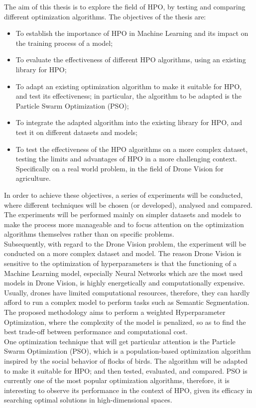 The aim of this thesis is to explore the field of HPO, by testing and comparing different optimization algorithms.
The objectives of the thesis are:
\begin{itemize}[itemsep=0.1cm]
	\item To establish the importance of HPO in Machine Learning and its impact on the training process of a model;
	\item To evaluate the effectiveness of different HPO algorithms, using an existing library for HPO;
	\item To adapt an existing optimization algorithm to make it suitable for HPO, and test its effectiveness; in particular, the algorithm to be adapted is the Particle Swarm Optimization (PSO);
	\item To integrate the adapted algorithm into the existing library for HPO, and test it on different datasets and models;
	\item To test the effectiveness of the HPO algorithms on a more complex dataset, testing the limits and advantages of HPO in a more challenging context. Specifically on a real world problem, in the field of Drone Vision for agriculture.
\end{itemize}
In order to achieve these objectives, a series of experiments will be conducted, where different techniques will be chosen (or developed), analysed and compared. The experiments will be performed mainly on simpler datasets and models to make the process more manageable and to focus attention on the optimization algorithms themselves rather than on specific problems.
\\[0.3cm]Subsequently, with regard to the Drone Vision problem, the experiment will be conducted on a more complex dataset and model. The reason Drone Vision is sensitive to the optimization of hyperparameters is that the functioning of a Machine Learning model, especially Neural Networks which are the most used models in Drone Vision, is highly energetically and computationally expensive. Usually, drones have limited computational resources, therefore, they can hardly afford to run a complex model to perform tasks such as Semantic Segmentation. The proposed methodology aims to perform a weighted Hyperparameter Optimization, where the complexity of the model is penalized, so as to find the best trade-off between performance and computational cost. 
\\[0.3cm]One optimization technique that will get particular attention is the Particle Swarm Optimization (PSO), which is a population-based optimization algorithm inspired by the social behavior of flocks of birds. The algorithm will be adapted to make it suitable for HPO; and then tested, evaluated, and compared. PSO is currently one of the most popular optimization algorithms, therefore, it is interesting to observe its performance in the context of HPO, given its efficacy in searching optimal solutions in high-dimensional spaces. 

